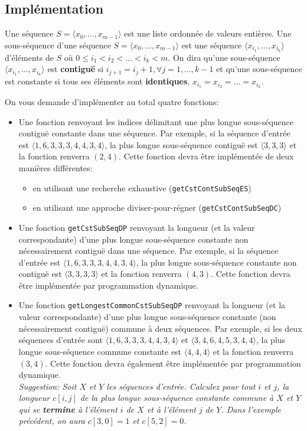 \documentclass[a4paper,10pt]{article}
\begin{document}
\subsection*{Implémentation}

Une séquence $S=\langle x_0,\ldots,x_{m-1}\rangle$ est une liste
ordonnée de valeurs entières. Une sous-séquence d'une séquence
$S=\langle x_0,\ldots,x_{m-1}\rangle$ est une séquence $\langle
x_{i_1},\ldots,x_{i_k}\rangle$ d'éléments de $S$ où $0\leq i_1<i_2<\ldots<i_k<m$. On
dira qu'une sous-séquence $\langle x_{i_1},\ldots,x_{i_k}\rangle$ est
{\bf contiguë} si $i_{j+1}=i_{j}+1, \forall j=1,\ldots,k-1$ et qu'une
sous-séquence est constante si tous ses éléments sont {\bf identiques},
$x_{i_1}=x_{i_2}=\ldots=x_{i_k}$.

On vous demande d'implémenter au total quatre fonctions:

\begin{itemize}
\item Une fonction renvoyant les indices délimitant une plus longue
  sous-séquence contiguë constante dans une séquence. Par exemple, si
  la séquence d'entrée est $\langle 1,6,3,3,3,4,4,3,4\rangle$, la plus
  longue sous-séquence contiguë est $\langle 3,3,3\rangle$ et la
  fonction renverra $(2,4)$. Cette fonction devra être implémentée de
  deux manières différentes:
\begin{itemize}
\item en utilisant une recherche exhaustive (\texttt{getCstContSubSeqES})
\item en utilisant une approche diviser-pour-régner (\texttt{getCstContSubSeqDC})
\end{itemize}

\item Une fonction \texttt{getCstSubSeqDP} renvoyant la longueur (et la valeur correspondante)
  d'une plus longue sous-séquence constante non nécessairement
  contiguë dans une séquence. Par exemple, si la séquence d'entrée est
  $\langle 1,6,3,3,3,4,4,3,4\rangle$, la plus longue sous-séquence
  constante non contiguë est $\langle 3,3,3,3\rangle$ et la fonction
  renverra $(4,3)$. Cette fonction devra être implémentée par
 programmation dynamique.

\item Une fonction \texttt{getLongestCommonCstSubSeqDP} renvoyant la longueur (et la valeur correspondante)
  d'une plus longue sous-séquence constante (non nécessairement
  contiguë) commune à deux séquences. Par exemple, si les deux
  séquences d'entrée sont $\langle 1,6,3,3,3,4,4,3,4\rangle$ et
  $\langle 3,4,6,4,5,3,4,4\rangle$, la plus longue sous-séquence
  commune constante est $\langle 4,4,4 \rangle$ et la fonction
  renverra $(3,4)$. Cette fonction devra également être implémentée
  par programmation dynamique.\\

{\it Suggestion: Soit $X$ et $Y$ les séquences d'entrée. Calculez pour
  tout $i$ et $j$, la longueur $c[i,j]$ de la plus longue
  sous-séquence constante commune à $X$ et $Y$ qui se {\bf termine} à
  l'élément $i$ de $X$ et à l'élément $j$ de $Y$. Dans l'exemple
  précédent, on aura $c[3,0]=1$ et $c[5,2]=0$.}
\end{itemize}
\end{document}
